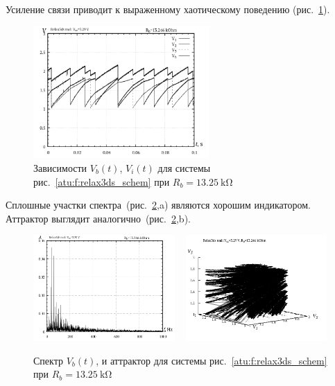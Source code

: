 Усиление связи приводит к выраженному хаотическому поведению
(рис.~\ref{atu:f:relax3ds_t_13246}).

\begin{figure}[htb!]
  \centerline{\includegraphics[width=0.6\textwidth]{p/relax3ds_t_013246.png} }
  \caption{Зависимости $V_b(t)$, $V_i(t)$ для системы рис.~\ref{atu:f:relax3ds_schem} при $R_b=\SI{13.25}{\kilo\ohm}$ }
  \label{atu:f:relax3ds_t_13246}
\end{figure}

Сплошные участки спектра~(рис.~\ref{atu:f:relax3ds_f_13246},a)
являются хорошим индикатором.
Аттрактор выглядит аналогично~(рис.~\ref{atu:f:relax3ds_f_13246},b).

\begin{figure}[htb!]
  \centerline{
    \includegraphics[width=0.48\textwidth]{p/relax3ds_f_013246.png}
    ~
    \includegraphics[width=0.48\textwidth]{p/relax3ds_v1v2v3_013246.png}
  }
  \caption{Спектр $V_b(t)$, и аттрактор для системы рис.~\ref{atu:f:relax3ds_schem} при $R_b=\SI{13.25}{\kilo\ohm}$ }
  \label{atu:f:relax3ds_f_13246}
\end{figure}


